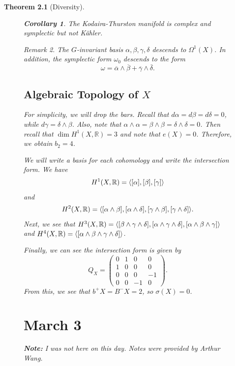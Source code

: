 \documentclass[leqno, openany]{memoir}
\DeclarePairedDelimiter{\gen}{\langle}{\rangle}
\newtheorem{thm}{Theorem}[chapter]
\newtheorem{cor}[thm]{Corollary}
\theoremstyle{definition}
\theoremstyle{remark}
\newtheorem{rmk}[thm]{Remark}
\theoremstyle{plain}
\theoremstyle{definition}
\theoremstyle{remark}
\newcommand{\R}{\mathbb{R}}
\begin{document}
\begin{thm}[Diversity]
\begin{figure}[H]
\begin{cor} The Kodaira-Thurston manifold is complex and symplectic but not
K\"ahler.  \end{cor}

\begin{rmk} The $G$-invariant basis $\alpha, \beta, \gamma, \delta$ descends to
    $\Omega^1(X)$. In addition, the symplectic form $\omega_0$ descends to the
    form \[ \omega = \overline{\alpha} \wedge \overline{\beta} +
    \overline{\gamma} \wedge \overline{\delta}. \] \end{rmk}

\section{Algebraic Topology of $X$}%

For simplicity, we will drop the bars. Recall that $d \alpha = d \beta = d
\delta = 0$, while $d \gamma = \delta \wedge \beta$. Also, note that $\alpha
\wedge \alpha = \beta \wedge \beta = \delta \wedge \delta = 0$. Then recall
that $\dim H^1(X, \R) = 3$ and note that $e(X) = 0$. Therefore, we obtain $b_2
= 4$.

We will write a basis for each cohomology and write the intersection form. We
have \[ H^1(X, \R) = \gen*{ [\alpha], [\beta], [\gamma] } \] and \[ H^2(X, \R)
= \gen*{ [\alpha \wedge \beta], [\alpha \wedge \delta], [\gamma \wedge \beta],
[\gamma \wedge \delta] }. \] Next, we see that $H^3(X, \R) = \gen*{ [\beta
\wedge \gamma \wedge \delta], [\alpha \wedge \gamma \wedge \delta], [\alpha
\wedge \beta \wedge \gamma] }$ and $H^4(X, \R) = \gen*{[\alpha \wedge \beta
\wedge \gamma \wedge \delta]}$.

Finally, we can see the intersection form is given by \[ Q_X =  \begin{pmatrix}
0 & 1 & 0 & 0 \\ 1 & 0 & 0 & 0 \\ 0 & 0 & 0 & -1 \\ 0 & 0 & -1 & 0
\end{pmatrix}. \] From this, we see that $b^+X = B^-X = 2$, so $\sigma(X) = 0$.

\chapter{March 3}%

\textbf{Note:} I was not here on this day. Notes were provided by Arthur Wang.


\end{figure}
\end{thm}
\end{document}
